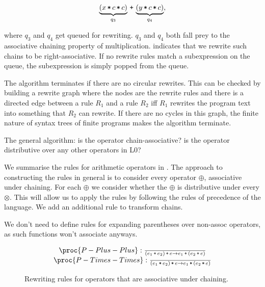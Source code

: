 \[\underbrace{\p{x \lt c \lt c}}_{q_3} \lp \underbrace{\p{y \lt c \lt
c}}_{q_4},\]

where $q_3$ and $q_4$ get queued for rewriting. $q_3$ and $q_4$ both fall prey
to the associative chaining property of multiplication.
 indicates that we rewrite such chains to be
right-associative. If no rewrite rules match a subexpression on the queue, the
subexpression is simply popped from the queue.

The algorithm terminates if there are no circular rewrites. This can be checked
by building a rewrite graph where the nodes are the rewrite rules and there is
a directed edge between a rule $R_1$ and a rule $R_2$ iff $R_1$ rewrites the
program text into something that $R_2$ can rewrite. If there are no cycles in
this graph, the finite nature of syntax trees of finite programs makes the
algorithm terminate.


The general algorithm: is the operator chain-associative? is the operator
distributive over any other operators in L0?

We summarise the rules for arithmetic operators in
. The approach to constructing the rules in
general is to consider every operator $\oplus$, associative under chaining. For
each $\oplus$ we consider whether the $\oplus$ is distributive under every
$\otimes$. This will allow us to apply the rules by following the rules of
precedence of the language. We add an additional rule to transform chains.

We don't need to define rules for expanding parentheses over non-assoc
operators, as such functions won't associate anyways.

\begin{figure*}[htbp!]

\[
\begin{matrix}
\proc{P-Plus-Plus}:{\over
\p{e_1 \lp e_2}\lp e \rightarrow e_1 \lp \p{ e_2 \lp e }
}\\
\proc{P-Times-Times}:{\over
\p{e_1\lt e_2}\lt e \rightarrow e_1 \lt \p{ e_2 \lt e }
}\\
\end{matrix}
\]
\caption[]{Rewriting rules for operators that are associative under chaining.}
\label{figure:rewriting-chaining}
\end{figure*}


